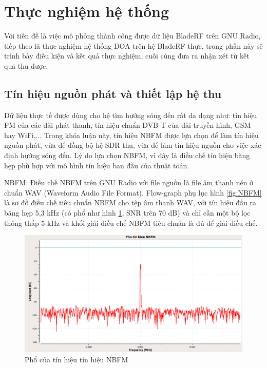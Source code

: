 \section{Thực nghiệm hệ thống}

Với tiền đề là việc mô phỏng thành công  được dữ liệu BladeRF trên GNU Radio, tiếp theo là thực nghiệm hệ thống DOA trên hệ BladeRF thực, trong phần này sẽ trình bày điều kiện và kết quả thực nghiệm, cuối cùng đưa ra nhận xét từ kết quả thu được.

\subsection{Tín hiệu nguồn phát và thiết lập hệ thu}

Dữ liệu thực tế được dùng cho hệ tìm hướng sóng đến rất da dạng như: tín hiệu FM của các đài phát thanh, tín hiệu chuẩn DVB-T của đài truyền hình, GSM hay WiFi,... Trong khóa luận này, tín hiệu NBFM được lựa chọn để làm tín hiệu nguồn phát, vừa để đồng bộ hệ SDR thu, vừa để làm tín hiệu nguồn cho việc xác định hướng sóng đến. Lý do lựa chọn NBFM, vì đây là điều chế tín hiệu băng hẹp phù hợp với mô hình tín hiệu ban đầu của thuật toán.

NBFM: Điều chế NBFM trên GNU Radio với file nguồn là file âm thanh nén ở chuẩn WAV (Waveform Audio File Format). Flow-graph phụ lục hình \ref{fig:NBFM} là sơ đồ điều chế tiêu chuẩn NBFM cho tệp âm thanh WAV, với tín hiệu đầu ra băng hẹp 5,3 kHz (có phổ như hình \ref{fig:nbfmspectrum}, SNR trên 70 dB) và chỉ cần một bộ lọc thông thấp 5 kHz và khối giải điều chế NBFM tiêu chuẩn là đủ để giải điều chế.
\begin{figure} [!h]
	\centering
	\includegraphics[width=1\linewidth]{figures/nbfmspectrum.png}
	\caption{Phổ của tín hiệu tín hiệu NBFM}
	\label{fig:nbfmspectrum}
\end{figure}


